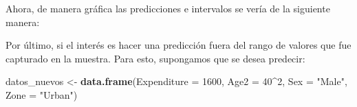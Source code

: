\documentclass[
  spanish,
  12pt,
]{book}
\newenvironment{Shaded}{\begin{snugshade}}{\end{snugshade}}
\newcommand{\AttributeTok}[1]{\textcolor[rgb]{0.13,0.29,0.53}{#1}}
\newcommand{\DataTypeTok}[1]{\textcolor[rgb]{0.13,0.29,0.53}{#1}}
\newcommand{\DecValTok}[1]{\textcolor[rgb]{0.00,0.00,0.81}{#1}}
\newcommand{\FloatTok}[1]{\textcolor[rgb]{0.00,0.00,0.81}{#1}}
\newcommand{\FunctionTok}[1]{\textcolor[rgb]{0.13,0.29,0.53}{\textbf{#1}}}
\newcommand{\NormalTok}[1]{#1}
\newcommand{\OtherTok}[1]{\textcolor[rgb]{0.56,0.35,0.01}{#1}}
\newcommand{\SpecialCharTok}[1]{\textcolor[rgb]{0.81,0.36,0.00}{\textbf{#1}}}
\newcommand{\StringTok}[1]{\textcolor[rgb]{0.31,0.60,0.02}{#1}}
\begin{document}
Ahora, de manera gráfica las predicciones e intervalos se vería de la siguiente manera:

\begin{Shaded}
\end{Shaded}

Por último, si el interés es hacer una predicción fuera del rango de valores que fue capturado en la muestra. Para esto, supongamos que se desea predecir:

\begin{Shaded}
\begin{Highlighting}[]
\NormalTok{datos\_nuevos }\OtherTok{\textless{}{-}} \FunctionTok{data.frame}\NormalTok{(}\AttributeTok{Expenditure =} \DecValTok{1600}\NormalTok{,}
                           \AttributeTok{Age2 =} \DecValTok{40}\SpecialCharTok{\^{}}\DecValTok{2}\NormalTok{, }\AttributeTok{Sex =} \StringTok{"Male"}\NormalTok{,}
                           \AttributeTok{Zone =} \StringTok{"Urban"}\NormalTok{)}
\end{Highlighting}
\end{Shaded}
\end{document}

